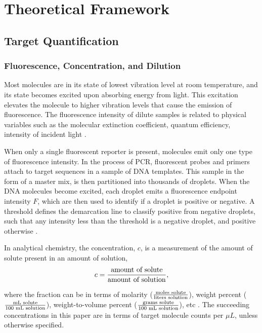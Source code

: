 \chapter{Theoretical Framework}
\label{sec:theoreticalframework} 

\section{Target Quantification}
\label{sec:dpcr_ch3}

\subsection{Fluorescence, Concentration, and Dilution}
\label{sec:targetconc_ch3_stockDil}
Most molecules are in its state of lowest vibration level at room temperature, and its state becomes excited upon absorbing energy from light. This excitation elevates the molecule to higher vibration levels that cause the emission of fluorescence. The fluorescence intensity of dilute samples is related to physical variables such as the molecular extinction coefficient, quantum efficiency, intensity of incident light \cite{Elmer2000}.

When only a single fluorescent reporter is present, molecules emit only one type of fluorescence intensity. In the process of PCR, fluorescent probes and primers attach to target sequences in a sample of DNA templates. This sample in the form of a master mix, is then partitioned into thousands of droplets. When the DNA molecules become excited, each droplet emits a fluorescence endpoint intensity \(F\), which are then used to identify if a droplet is positive or negative. A threshold defines the demarcation line to classify positive from negative droplets, such that any intensity less than the threshold is a negative droplet, and positive otherwise \cite{Trypsteen2015}. 

In analytical chemistry, the concentration, \(c\), is a measurement of the amount of solute present in an amount of solution,
\[
    c = \frac{\textup{amount of solute}}{\textup{amount of solution}},
\]

where the fraction can be in terms of molarity (\(\frac{\textup{moles solute}}{\textup{liters solution}}\)), weight percent (\(\frac{\textup{mL solute}}{\textup{100 mL solution}}\)), weight-to-volume percent (\(\frac{\textup{grams solute}}{\textup{100 mL solution}}\)), etc \cite{Harvey2010}. The succeeding concentrations in this paper are in terms of target molecule counts per \(\mu L\), unless otherwise specified.

